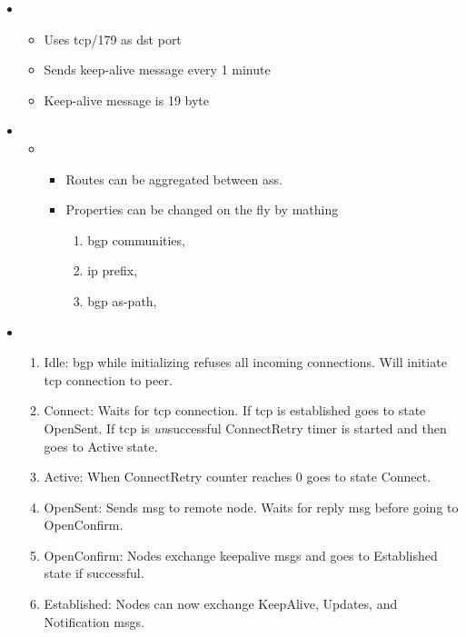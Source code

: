 \begin{itemize}
    \item {}
    \begin{itemize}
        \item Uses tcp/179 as \gls{dst} port
        \item Sends keep-alive message every 1 minute
        \item Keep-alive message is 19 byte
    \end{itemize}
    \item {}
    \begin{itemize}
        \item {}
        \begin{itemize}
            \item Routes can be aggregated between \glspl{as}.
            \item Properties can be changed on the fly by mathing
            \begin{enumerate}[label={\alph*)}]
                \item \Gls{bgp} communities,
                \item \Gls{ip} prefix,
                \item \Gls{bgp} as-path, 
            \end{enumerate}
        \end{itemize}
    \end{itemize}
    \item {}
    \begin{enumerate}
        \item Idle: \gls{bgp} while initializing refuses all incoming connections. Will initiate \gls{tcp} connection to peer.
        \item Connect: Waits for \gls{tcp} connection. If \gls{tcp} is established goes to state OpenSent. If \gls{tcp} is \textit{un}successful ConnectRetry timer is started and then goes to Active state.
        \item Active: When ConnectRetry counter reaches 0 goes to state Connect.
        \item OpenSent: Sends \gls{msg} to remote node. Waits for reply \gls{msg} before going to OpenConfirm.
        \item OpenConfirm: Nodes exchange keepalive \glspl{msg} and goes to Established state if successful.
        \item Established: Nodes can now exchange KeepAlive, Updates, and Notification \glspl{msg}.
    \end{enumerate}
\end{itemize}

